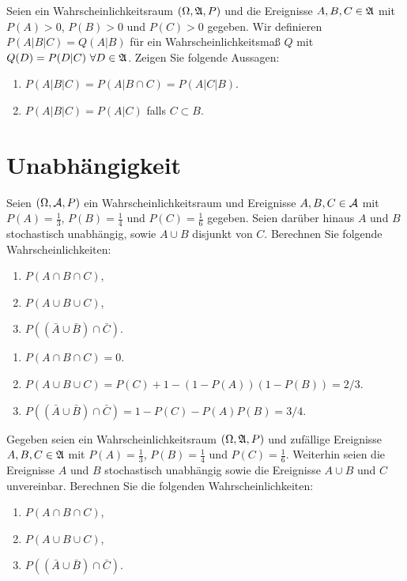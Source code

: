 Seien ein Wahrscheinlichkeitsraum $(\Omega, \mathfrak A, P)$ und die Ereignisse
$A,B,C\in\mathfrak A$ mit $P(A)>0$, $P(B)>0$ und $P(C)>0$ gegeben. Wir definieren
$P(A|B|C)= Q(A|B)$ für ein Wahrscheinlichkeitsmaß $Q$ mit $Q(D)=P(D|C) \ \forall
D\in\mathfrak A$. Zeigen Sie folgende Aussagen:
\begin{enumerate}
    \item $P(A|B|C) = P(A| B \cap C) = P(A|C|B)$. 
    \item $P(A|B|C) = P(A| C)$ falls $C \subset B$.
\end{enumerate}



\section{Unabhängigkeit}

Seien $(\Omega, \mathcal A, P)$ ein Wahrscheinlichkeitsraum und Ereignisse $A, B, C
\in \mathcal A$ mit $P(A)=\frac{1}{3}$, $P(B)=\frac{1}{4}$ und $P(C)=\frac{1}{6}$
gegeben. Seien darüber hinaus $A$ und $B$ stochastisch unabhängig, sowie $A\cup B$ 
disjunkt von $C$. Berechnen Sie folgende Wahrscheinlichkeiten:
\begin{enumerate}
    \item $P(A \cap B \cap C)$,
    \item $P(A \cup B \cup C)$,
    \item $P( ( \bar A \cup \bar B) \cap \bar C )$.
\end{enumerate}

\solution
\begin{enumerate}
    \item $P(A \cap B \cap C) = 0$.
    \item $P(A \cup B \cup C) = P(C) + 1 - (1 - P(A))(1-P(B)) = 2/3$.
    \item $P( ( \bar A \cup \bar B) \cap \bar C ) = 1 - P(C) - P(A)P(B) = 3/4$.
\end{enumerate}

Gegeben seien  ein Wahrscheinlichkeitsraum $(\Omega, \mathfrak{A}, P)$ und zuf\"allige Ereignisse $A, B, C
\in \mathfrak{A}$  mit $P(A)=\frac{1}{3}$, $P(B)=\frac{1}{4}$ und $P(C)=\frac{1}{6}$. 
Weiterhin seien die Ereignisse $A$ und $B$ stochastisch unabhängig sowie die Ereignisse $A\cup B$
und $C$ unvereinbar. Berechnen Sie die folgenden Wahrscheinlichkeiten:
\begin{enumerate}
    \item $P(A \cap B \cap C)$,
    \item $P(A \cup B \cup C)$,
    \item $P( ( \bar A \cup \bar B) \cap \bar C )$.
\end{enumerate}

